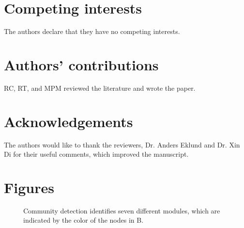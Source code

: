 \documentclass{bmcart}
\begin{document}

\begin{backmatter}

\section*{Competing interests}
  The authors declare that they have no competing interests.

\section*{Authors' contributions}
  RC, RT, and MPM reviewed the literature and wrote the paper.

\section*{Acknowledgements}
  The authors would like to thank the reviewers, Dr. Anders Eklund and Dr. Xin Di for their useful comments, which improved the manuscript.
  
  


\section*{Figures}
  \begin{figure}[h!]
  \caption{\label{fig:estimating_connectomes} Community detection identifies seven different modules, which are indicated by the color of the nodes in B.}
      \end{figure}


\end{backmatter}
\end{document}
